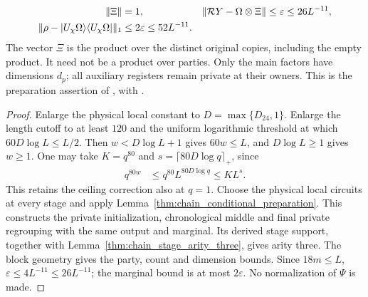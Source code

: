 \begin{lemma}
\begin{align}
        \|\Xi\|                          & =1,                               &
        \|\mathcal RY-\Omega\otimes\Xi\| & \le\varepsilon\le26L^{-11},\notag   \\
        \|\rho-|U_\chi\Omega\rangle\langle U_\chi\Omega|\|_1
                                         & \le2\varepsilon\le52L^{-11}.
        \label{eq:chain_physical_errors}
    \end{align}
    The vector $\Xi$ is the product over the distinct original copies,
    including the empty product. It need not be a product over parties.
    Only the main factors have dimensions $d_p$; all auxiliary registers
    remain private at their owners. This is the preparation
    assertion of \cite[Part~II, the sweep proposition and
        the density estimate in the proof of Theorem~B]{TNLean2026OneDimensional},
    with \cite{gap:tnlean_one_dimensional_band_sweep_corrections}.
\end{lemma}
\begin{proof}
    \leanok
    Enlarge the physical local constant to $D=\max\{D_{24},1\}$.
    Enlarge the length cutoff to at least $120$ and the uniform
    logarithmic threshold at which $60D\log L\le L/2$.
    Then $w<D\log L+1$ gives $60w\le L$, and $D\log L\ge1$
    gives $w\ge1$. One may take $K=q^{80}$ and
    $s=\lceil80D\log q\rceil_+$, since
    \begin{align}
        q^{80w} & \le q^{80}L^{80D\log q}\le KL^s.
        \label{eq:chain_physical_ceiling}
    \end{align}
    This retains the ceiling correction also at $q=1$.
    Choose the physical local circuits at every stage and apply
    Lemma~\ref{thm:chain_conditional_preparation}. This constructs
    the private initialization, chronological middle and final private
    regrouping with the same output and marginal. Its derived stage
    support, together with Lemma~\ref{thm:chain_stage_arity_three},
    gives arity three. The block geometry gives the party, count and
    dimension bounds. Since $18m\le L$,
    $\varepsilon\le4L^{-11}\le26L^{-11}$; the marginal bound
    is at most $2\varepsilon$. No normalization of $\Psi$ is made.
\end{proof}

